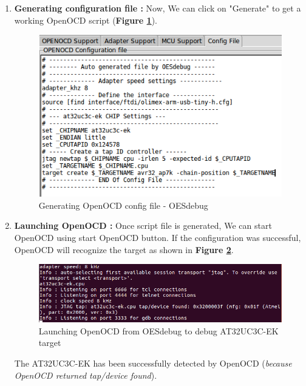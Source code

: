 \begin{enumerate}
\begin{enumerate}
		\item \textbf{Generating configuration file : } Now, We can click on "Generate" to get a working OpenOCD script (\textbf{Figure \ref{Generating OpenOCD config file - OESdebug}}).
		\begin{figure}[H]
			\centering
        	\includegraphics[scale=0.32]{img/solution/OESdebug-generatedScript.png}
        	\caption{Generating OpenOCD config file - OESdebug}
        	\label{Generating OpenOCD config file - OESdebug}
    	\end{figure}		
		
		
		\item \textbf{Launching OpenOCD : } Once script file is generated, We can start OpenOCD using start OpenOCD button. If the configuration was successful, OpenOCD will recognize the target as shown in \textbf{Figure \ref{Launching OpenOCD from OESdebug on AT32UC3C-EK target}}.		
		\begin{figure}[H]
			\centering
        	\includegraphics[scale=0.32]{img/solution/at32uc3c0512c-found-openocd.png}
        	\caption{Launching OpenOCD from OESdebug to debug AT32UC3C-EK target}
        	\label{Launching OpenOCD from OESdebug on AT32UC3C-EK target}
    	\end{figure}	
	
		The AT32UC3C-EK has been successfully detected by OpenOCD (\textit{because OpenOCD returned \textit{tap/device found}}).
		

\end{enumerate}
\end{enumerate}
